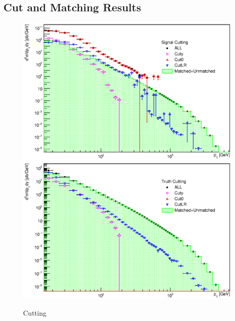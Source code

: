 \begin{appendices}

\chapter{Cut and Matching Results}

\begin{figure}[p]
  \centering
  \includegraphics[width=\textwidth]{Chapter3/SignalCutting.eps}
  \includegraphics[width=\textwidth]{Chapter3/TruthCutting.eps}
  \caption{Cutting}
  \label{fig:Cutting}
\end{figure}


\end{appendices}
